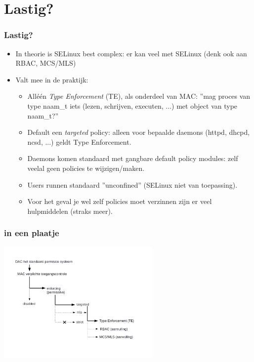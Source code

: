 \section{Lastig?}
\begin{frame}
    \frametitle{Lastig?}
\begin{itemize}
\pause
\item In theorie is SELinux best complex: er kan veel met SELinux (denk ook aan RBAC, MCS/MLS)
\pause
\item Valt mee in de praktijk:
	\begin{itemize}
	\pause
	\item All{\'e}{\'e}n {\it Type Enforcement} (TE), als onderdeel van MAC:
	''mag proces van type naam\_t iets (lezen, schrijven, executen, ...) met object van type naam\_t?'' \\
	\pause
    \item Default een {\it targeted} policy: alleen voor bepaalde daemons (httpd, dhcpd, ncsd, ...) geldt Type Enforcement.
	\pause
	\item Daemons komen standaard met gangbare default policy modules: zelf veelal geen policies te wijzigen/maken.
	\pause
	\item Users runnen standaard ''unconfined'' (SELinux niet van toepassing).
	\pause
	\item Voor het geval je wel zelf policies moet verzinnen zijn er veel hulpmiddelen (straks meer).
	\end{itemize}
\end{itemize}
\end{frame}

\begin{frame}
    \frametitle{in een plaatje}
 \includegraphics[width=300px]{samenvatting.png}
\end{frame}

